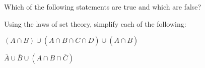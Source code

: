\documentclass[a4paper, english, 12pt]{article} %
\begin{document}
\begin{subproblem}
  Which of the following statements are true and which are false?
\end{subproblem}

\begin{problem}[17]
  Using the laws of set theory, simplify each of the following:
\end{problem}

\begin{subproblem}[2]
  $(A \cap B) \cup (A \cap B \cap \overline{C} \cap D) \cup (\overline{A} \cap B)$
\end{subproblem}

\begin{subproblem}[4]
  $\overline{A} \cup \overline{B} \cup (A \cap B \cap \overline{C})$
\end{subproblem}
\end{document}
